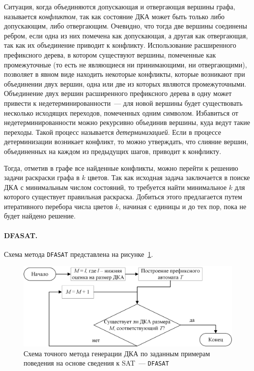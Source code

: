 Ситуация, когда объединяются допускающая и отвергающая вершины графа, называется \emph{конфликтом}, так как состояние ДКА может быть только либо допускающим, либо отвергающим.
Очевидно, что тогда две вершины соединены ребром, если одна из них помечена как допускающая, а другая как отвергающая, так как их объединение приводит к конфликту.
Использование расширенного префиксного дерева, в котором существуют вершины, помеченные как промежуточные (то есть не являющиеся ни принимающими, ни отвергающими), позволяет в явном виде находить некоторые конфликты, которые возникают при объединении двух вершин, одна или две из которых являются промежуточными.
Объединение двух вершин расширенного префиксного дерева в одну может привести к недетерминированности~--- для новой вершины будет существовать несколько исходящих переходов, помеченных одним символом.
Избавиться от недетерминированности можно рекурсивно объединив вершины, куда ведут такие переходы.
Такой процесс называется \emph{детерминизацией}.
Если в процессе детерминизации возникает конфликт, то можно утверждать, что слияние вершин, объединенных на каждом из предыдущих шагов, приводит к конфликту.

Тогда, отметив в графе все найденные конфликты, можно перейти к решению задачи раскраски графа в $k$ цветов.
Так как исходная задача заключается в поиске ДКА с минимальным числом состояний, то требуется найти минимальное $k$ для которого существует правильная раскраска.
Добиться этого предлагается путем итеративного перебора числа цветов $k$, начиная с единицы и до тех пор, пока не будет найдено решение.

\paragraph*{DFASAT.}


Схема метода \texttt{DFASAT} представлена на рисунке~\ref{img:dfasat-algo}.


\begin{figure}[ht]
  \centering
  \includegraphics[scale=0.7]{img/ntv/basic.jpg}
  \caption{Схема точного метода генерации ДКА по заданным примерам поведения на основе сведения к SAT~--- \texttt{DFASAT}}
  \label{img:dfasat-algo}
\end{figure}


